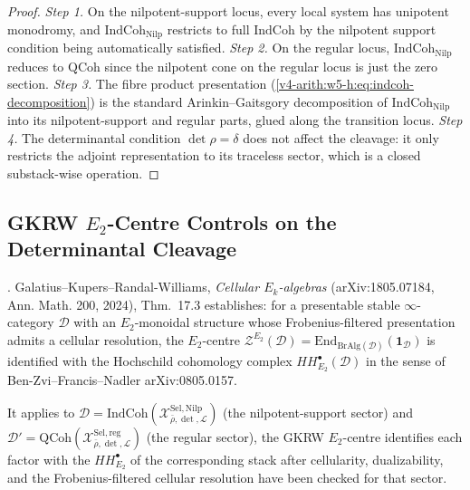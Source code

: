 \begin{proof}
\emph{Step 1.} On the nilpotent-support locus, every local system has
unipotent monodromy, and \(\mathrm{IndCoh}_{\mathrm{Nilp}}\) restricts to
full \(\mathrm{IndCoh}\) by the nilpotent support condition being
automatically satisfied. \emph{Step 2.} On the regular locus,
\(\mathrm{IndCoh}_{\mathrm{Nilp}}\) reduces to \(\mathrm{QCoh}\) since
the nilpotent cone on the regular locus is just the zero section.
\emph{Step 3.} The fibre product presentation
(\ref{v4-arith:w5-h:eq:indcoh-decomposition}) is the standard
Arinkin--Gaitsgory decomposition of
\(\mathrm{IndCoh}_{\mathrm{Nilp}}\) into its nilpotent-support and
regular parts, glued along the transition locus. \emph{Step 4.} The
determinantal condition \(\det\rho=\delta\) does not affect the
cleavage: it only restricts the adjoint representation to its
traceless sector, which is a closed substack-wise operation.
\end{proof}

\subsection{GKRW \(E_{2}\)-Centre Controls on the Determinantal Cleavage}

\begin{theorem}
\label{v4-arith:w5-h:thm:gkrw-e2-centre}
\ClaimStatusConditional. Galatius--Kupers--Randal-Williams,
\emph{Cellular \(E_{k}\)-algebras} (arXiv:1805.07184, Ann. Math. 200,
2024), Thm.~17.3 establishes: for a presentable stable
\(\infty\)-category \(\mathcal{D}\) with an \(E_{2}\)-monoidal structure
whose Frobenius-filtered presentation admits a cellular resolution,
the \(E_{2}\)-centre
\(\mathcal{Z}^{E_{2}}(\mathcal{D})=\mathrm{End}_{\mathrm{BrAlg}(\mathcal{D})}(\mathbf{1}_{\mathcal{D}})\)
is identified with the Hochschild cohomology complex
\(HH^{\bullet}_{E_{2}}(\mathcal{D})\) in the sense of
Ben-Zvi--Francis--Nadler arXiv:0805.0157.

It applies to
\(\mathcal{D}=\mathrm{IndCoh}(\mathcal{X}^{\mathrm{Sel},\mathrm{Nilp}}_{\bar\rho,\det,\mathcal{L}})\)
(the nilpotent-support sector) and
\(\mathcal{D}'=\mathrm{QCoh}(\mathcal{X}^{\mathrm{Sel},\mathrm{reg}}_{\bar\rho,\det,\mathcal{L}})\)
(the regular sector), the GKRW \(E_{2}\)-centre identifies each factor
with the \(HH^{\bullet}_{E_{2}}\) of the corresponding stack after
cellularity, dualizability, and the Frobenius-filtered cellular
resolution have been checked for that sector.
\end{theorem}

